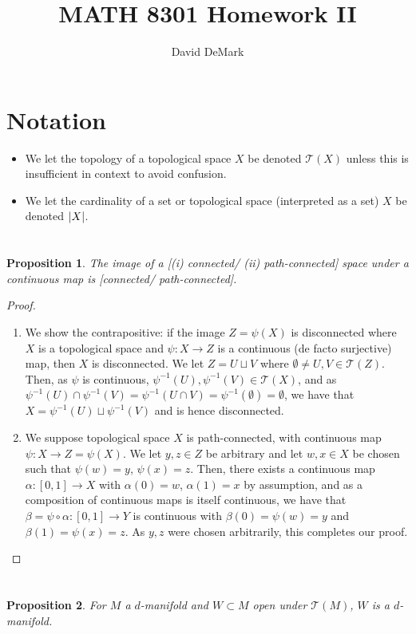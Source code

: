 \documentclass[english]{article}
\title{MATH 8301 Homework II}
\author{David DeMark}
\date{\due}
\DeclarePairedDelimiter\abs{\lvert}{\rvert}%
\newcommand{\prob}[1]{\setcounter{section}{#1-1}\section{}}
\newtheorem*{proposition*}{Proposition}
\theoremstyle{remark}
\theoremstyle{definition}
\newcommand{\Tt}{\mathcal{T}}
\begin{document}
\maketitle
\section*{Notation}
\begin{itemize}
	\item We let the topology of a topological space $X$ be denoted $\Tt(X)$ unless this is insufficient in context to avoid confusion.
\item We let the cardinality of a set or topological space (interpreted as a set) $X$ be denoted $\abs{X}$.
\end{itemize}
\prob{1}
\begin{proposition*}
	The image of a [(i) connected/ (ii) path-connected] space under a continuous map is [connected/ path-connected].
\end{proposition*}
\begin{proof}
	\begin{enumerate}[label=(\roman*)]
		\item We show the contrapositive: if the image $Z=\psi(X)$ is disconnected where $X$ is a topological space and $\psi:X\to Z$ is a continuous (de facto surjective) map, then $X$ is disconnected. We let $Z=U\sqcup V$ where $\emptyset \neq U,V\in \Tt(Z)$. Then, as $\psi$ is continuous, $\psi^{-1}(U),\psi^{-1}(V)\in \Tt(X)$, and as $\psi^{-1}(U)\cap \psi^{-1}(V)=\psi^{-1}(U\cap V)=\psi^{-1}(\emptyset)=\emptyset$, we have that $X=\psi^{-1}(U)\sqcup \psi^{-1}(V)$ and is hence disconnected.
		\item We suppose topological space $X$ is path-connected, with continuous map $\psi: X\to Z=\psi(X)$. We let $y,z\in Z$ be arbitrary and let $w,x\in X$ be chosen such that $\psi(w)=y$, $\psi(x)=z$. Then, there exists a continuous map $\alpha:[0,1]\to X$ with $\alpha(0)=w$, $\alpha(1)=x$ by assumption, and as a composition of continuous maps is itself continuous, we have that $\beta=\psi\circ \alpha:[0,1]\to Y$ is continuous with $\beta(0)=\psi(w)=y$ and $\beta(1)=\psi(x)=z$. As $y,z$ were chosen arbitrarily, this completes our proof.
	\end{enumerate}
\end{proof}
\prob{2} \begin{proposition*}
	For $M$ a $d$-manifold and $W\subset M$ open under $\Tt(M)$, $W$ is a $d$-manifold.
\end{proposition*}
\end{document}

